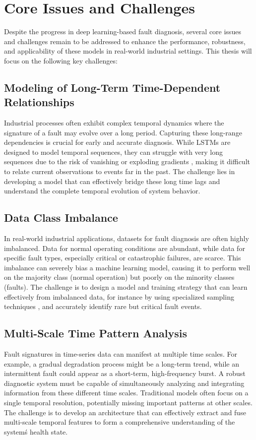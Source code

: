 \section{Core Issues and Challenges}
\label{sec:introduction:issues_challenges}

Despite the progress in deep learning-based fault diagnosis, several core issues and challenges remain to be addressed to enhance the performance, robustness, and applicability of these models in real-world industrial settings. This thesis will focus on the following key challenges:

\subsection{Modeling of Long-Term Time-Dependent Relationships}
Industrial processes often exhibit complex temporal dynamics where the signature of a fault may evolve over a long period. Capturing these long-range dependencies is crucial for early and accurate diagnosis. While LSTMs are designed to model temporal sequences, they can struggle with very long sequences due to the risk of vanishing or exploding gradients \cite{pascanu2013difficulty}, making it difficult to relate current observations to events far in the past. The challenge lies in developing a model that can effectively bridge these long time lags and understand the complete temporal evolution of system behavior.

\subsection{Data Class Imbalance}
In real-world industrial applications, datasets for fault diagnosis are often highly imbalanced. Data for normal operating conditions are abundant, while data for specific fault types, especially critical or catastrophic failures, are scarce. This imbalance can severely bias a machine learning model, causing it to perform well on the majority class (normal operation) but poorly on the minority classes (faults). The challenge is to design a model and training strategy that can learn effectively from imbalanced data, for instance by using specialized sampling techniques \cite{chawla2002smote}, and accurately identify rare but critical fault events.

\subsection{Multi-Scale Time Pattern Analysis}
Fault signatures in time-series data can manifest at multiple time scales. For example, a gradual degradation process might be a long-term trend, while an intermittent fault could appear as a short-term, high-frequency burst. A robust diagnostic system must be capable of simultaneously analyzing and integrating information from these different time scales. Traditional models often focus on a single temporal resolution, potentially missing important patterns at other scales. The challenge is to develop an architecture that can effectively extract and fuse multi-scale temporal features \cite{sun2022multiscale} to form a comprehensive understanding of the system\'s health state.

